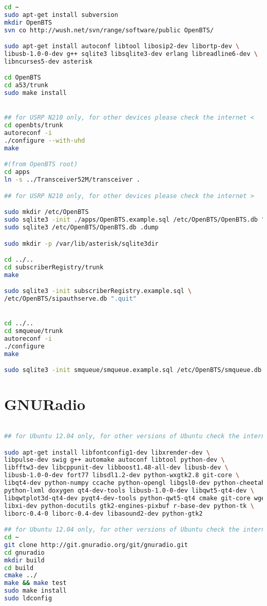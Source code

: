 \begin{lstlisting}[language=bash]
cd ~
sudo apt-get install subversion
mkdir OpenBTS
svn co http://wush.net/svn/range/software/public OpenBTS/

sudo apt-get install autoconf libtool libosip2-dev libortp-dev \
libusb-1.0-0-dev g++ sqlite3 libsqlite3-dev erlang libreadline6-dev \
libncurses5-dev asterisk

cd OpenBTS
cd a53/trunk
sudo make install


## for USRP N210 only, for other devices please check the internet <
cd openbts/trunk
autoreconf -i
./configure --with-uhd
make

#(from OpenBTS root)
cd apps
ln -s ../Transceiver52M/transceiver .

## for USRP N210 only, for other devices please check the internet >

sudo mkdir /etc/OpenBTS
sudo sqlite3 -init ./apps/OpenBTS.example.sql /etc/OpenBTS/OpenBTS.db ".quit"
sudo sqlite3 /etc/OpenBTS/OpenBTS.db .dump

sudo mkdir -p /var/lib/asterisk/sqlite3dir

cd ../..
cd subscriberRegistry/trunk
make

sudo sqlite3 -init subscriberRegistry.example.sql \
/etc/OpenBTS/sipauthserve.db ".quit"


cd ../..
cd smqueue/trunk
autoreconf -i
./configure
make

sudo sqlite3 -init smqueue/smqueue.example.sql /etc/OpenBTS/smqueue.db ".quit"

\end{lstlisting}


\section{GNURadio}

\begin{lstlisting}[language=bash]

## for Ubuntu 12.04 only, for other versions of Ubuntu check the internet <

sudo apt-get install libfontconfig1-dev libxrender-dev \
libpulse-dev swig g++ automake autoconf libtool python-dev \
libfftw3-dev libcppunit-dev libboost1.48-all-dev libusb-dev \
libusb-1.0-0-dev fort77 libsdl1.2-dev python-wxgtk2.8 git-core \
libqt4-dev python-numpy ccache python-opengl libgsl0-dev python-cheetah \
python-lxml doxygen qt4-dev-tools libusb-1.0-0-dev libqwt5-qt4-dev \
libqwtplot3d-qt4-dev pyqt4-dev-tools python-qwt5-qt4 cmake git-core wget \
libxi-dev python-docutils gtk2-engines-pixbuf r-base-dev python-tk \
liborc-0.4-0 liborc-0.4-dev libasound2-dev python-gtk2

## for Ubuntu 12.04 only, for other versions of Ubuntu check the internet >
cd ~
git clone http://git.gnuradio.org/git/gnuradio.git
cd gnuradio
mkdir build
cd build
cmake ../
make && make test
sudo make install
sudo ldconfig

\end{lstlisting}